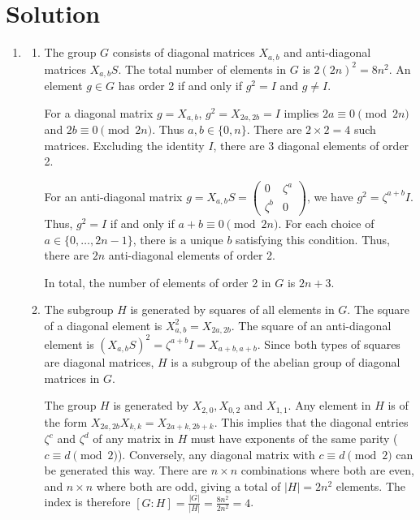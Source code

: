 \documentclass[10pt,a4paper]{article}
\begin{document}
\section*{Solution}
\begin{enumerate}[label=\fbox{\arabic*}]
  \item %
        \begin{enumerate}[label=(\arabic*)]
          \item The group $G$ consists of diagonal matrices $X_{a,b}$ and anti-diagonal matrices $X_{a,b}S$. The total number of elements in $G$ is $2(2n)^2 = 8n^2$. An element $g \in G$ has order 2 if and only if $g^2 = I$ and $g \neq I$.
          
          For a diagonal matrix $g = X_{a,b}$, $g^2 = X_{2a,2b} = I$ implies $2a \equiv 0 \pmod{2n}$ and $2b \equiv 0 \pmod{2n}$. Thus $a, b \in \{0, n\}$. There are $2 \times 2 = 4$ such matrices. Excluding the identity $I$, there are $3$ diagonal elements of order 2.
          
          For an anti-diagonal matrix $g = X_{a,b}S = \begin{pmatrix} 0 & \zeta^a \\ \zeta^b & 0 \end{pmatrix}$, we have $g^2 = \zeta^{a+b} I$. Thus, $g^2 = I$ if and only if $a+b \equiv 0 \pmod{2n}$. For each choice of $a \in \{0, \dots, 2n-1\}$, there is a unique $b$ satisfying this condition. Thus, there are $2n$ anti-diagonal elements of order 2.
          
          In total, the number of elements of order 2 in $G$ is $2n + 3$.
          
          \item The subgroup $H$ is generated by squares of all elements in $G$. The square of a diagonal element is $X_{a,b}^2 = X_{2a,2b}$. The square of an anti-diagonal element is $(X_{a,b}S)^2 = \zeta^{a+b} I = X_{a+b, a+b}$. Since both types of squares are diagonal matrices, $H$ is a subgroup of the abelian group of diagonal matrices in $G$. 
          
          The group $H$ is generated by $X_{2,0}, X_{0,2}$ and $X_{1,1}$. Any element in $H$ is of the form $X_{2a, 2b} X_{k,k} = X_{2a+k, 2b+k}$. This implies that the diagonal entries $\zeta^c$ and $\zeta^d$ of any matrix in $H$ must have exponents of the same parity ($c \equiv d \pmod 2$). 
          Conversely, any diagonal matrix with $c \equiv d \pmod 2$ can be generated this way. There are $n \times n$ combinations where both are even, and $n \times n$ where both are odd, giving a total of $|H| = 2n^2$ elements.
          The index is therefore $[G : H] = \frac{|G|}{|H|} = \frac{8n^2}{2n^2} = 4$.
          

\end{enumerate}
\end{enumerate}
\end{document}
